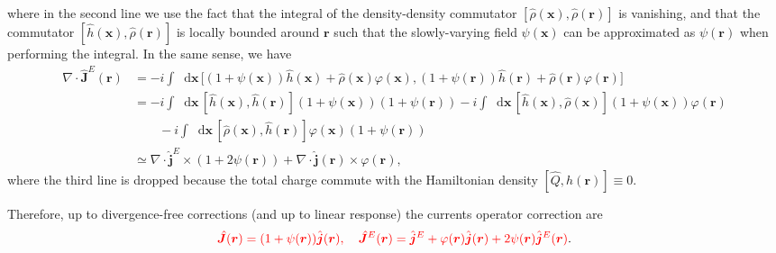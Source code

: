 \documentclass[10pt,nofootinbib,letterpaper]{revtex4}
\newcommand*\dd{\mathop{}\!\mathrm{d}}
\begin{document}
		where in the second line we use the fact that the integral of the density-density commutator $[\hat{\rho}(\bm{x}),\hat{\rho}(\bm{r})]$ is vanishing, and that the commutator $[\hat{h}(\bm{x}),\hat{\rho}(\bm{r})]$ is locally bounded around $\bm{r}$ such that the slowly-varying field $\psi(\bm{x})$ can be approximated as $\psi(\bm{r})$ when performing the integral. In the same sense, we have
		\begin{align*}
			\nabla\cdot\hat{\bm{J}}^E(\bm{r})&=-i\int\dd\bm{x}\,\bigg[(1+\psi(\bm{x}))\hat{h}(\bm{x})+\hat{\rho}(\bm{x})\varphi(\bm{x}),(1+\psi(\bm{r}))\hat{h}(\bm{r})+\hat{\rho}(\bm{r})\varphi(\bm{r})\bigg]\\
			&=-i\int\dd\bm{x}\,[\hat{h}(\bm{x}),\hat{h}(\bm{r})](1+\psi(\bm{x}))(1+\psi(\bm{r}))-i\int\dd\bm{x}\,[\hat{h}(\bm{x}),\hat{\rho}(\bm{x})](1+\psi(\bm{x}))\varphi(\bm{r})\\
			&\qquad-i\int\dd\bm{x}\,[\hat{\rho}(\bm{x}),\hat{h}(\bm{r})]\varphi(\bm{x})(1+\psi(\bm{r}))\\
			&\simeq\nabla\cdot\hat{\bm{j}}^E\times(1+2\psi(\bm{r}))+\nabla\cdot\hat{\bm{j}}(\bm{r})\times\varphi(\bm{r}),
		\end{align*}
		where the third line is dropped because the total charge commute with the Hamiltonian density $[\hat{Q},h(\bm{r})]\equiv0$.\par
		Therefore, up to divergence-free corrections (and up to linear response) the currents operator correction are
		\begin{equation}\label{2.1.4}
			{\color{red}\hat{\bm{J}}(\bm{r})=(1+\psi(\bm{r}))\hat{\bm{j}}(\bm{r}),\quad \hat{\bm{J}}^E(\bm{r})=\hat{\bm{j}}^E+\varphi(\bm{r})\hat{\bm{j}}(\bm{r})+2\psi(\bm{r})\hat{\bm{j}}^E(\bm{r})}.
		\end{equation}
\end{document}
